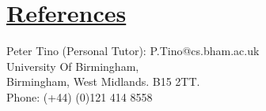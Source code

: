 \documentclass[11pt]{article}
\begin{document}
	\vspace{-20pt}
	\hspace{-100pt}\section*{\underline{References}}	
				Peter Tino (Personal Tutor):  P.Tino@cs.bham.ac.uk  \\
				University Of Birmingham,\\
				Birmingham, 
				West Midlands.
				B15 2TT.\\
				Phone: (+44) (0)121 414 8558\\
				
\end{document}
